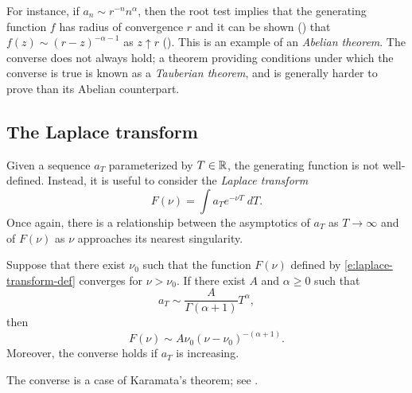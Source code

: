 For instance, if $a_n \sim r^{-n} n^\alpha$, then the root test implies that
the generating function $f$ has radius of convergence $r$ and it can be shown
() that $f(z) \sim (r - z)^{-\alpha-1}$ as
$z \uparrow r$ (). This is an
example of an \emph{Abelian theorem}. The converse does not always hold; a
theorem providing conditions under which the converse is true is known as a
\emph{Tauberian theorem}, and is generally harder to prove than its Abelian
counterpart. 


\subsection{The Laplace transform}

Given a sequence $a_T$ parameterized by $T \in {\mathbb R}$, the generating function is
not well-defined. Instead, it is useful to consider the \emph{Laplace transform}
\begin{equation}
\label{e:laplace-transform-def}
F(\nu) = \int a_T e^{-\nu T} \; dT.
\end{equation}
Once again, there is a relationship between the asymptotics of $a_T$ as $T\to\infty$
and of $F(\nu)$ as $\nu$ approaches its nearest singularity.

\begin{theorem}
Suppose that there exist $\nu_0$ such that
the function $F(\nu)$ defined by \eqref{e:laplace-transform-def} converges for
$\nu > \nu_0$. If there exist $A$ and $\alpha \ge 0$ such that
\begin{equation}
a_T \sim \frac{A}{\Gamma(\alpha + 1)} T^\alpha,
\end{equation}
then
\begin{equation}
F(\nu) \sim A \nu_0 (\nu - \nu_0)^{-(\alpha+1)}.
\end{equation}
Moreover, the converse holds if $a_T$ is increasing.
\end{theorem}

The converse is a case of Karamata's theorem; see \cite[Chapter V]{Widd41}.

